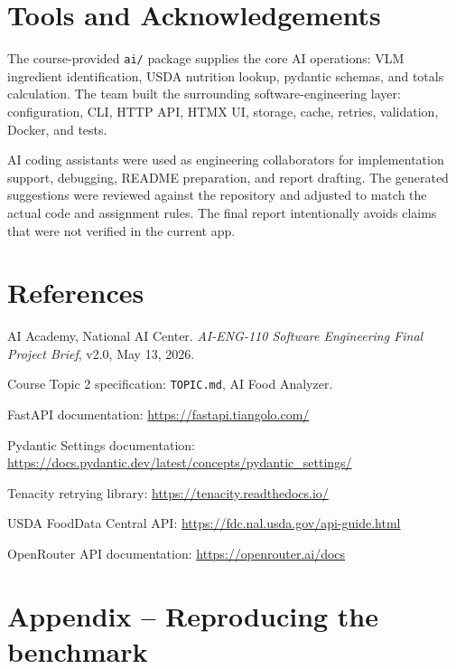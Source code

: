 \documentclass[11pt,a4paper]{article}
\begin{document}
\section{Tools and Acknowledgements}

The course-provided \texttt{ai/} package supplies the core AI operations: VLM ingredient identification, USDA nutrition lookup, pydantic schemas, and totals calculation. The team built the surrounding software-engineering layer: configuration, CLI, HTTP API, HTMX UI, storage, cache, retries, validation, Docker, and tests.

AI coding assistants were used as engineering collaborators for implementation support, debugging, README preparation, and report drafting. The generated suggestions were reviewed against the repository and adjusted to match the actual code and assignment rules. The final report intentionally avoids claims that were not verified in the current app.

\section*{References}

\begin{enumerate}[label={[\arabic*]},leftmargin=2.4em,itemsep=2pt]
  \item AI Academy, National AI Center. \textit{AI-ENG-110 Software Engineering Final Project Brief}, v2.0, May 13, 2026.
  \item Course Topic 2 specification: \texttt{TOPIC.md}, AI Food Analyzer.
  \item FastAPI documentation: \url{https://fastapi.tiangolo.com/}
  \item Pydantic Settings documentation: \url{https://docs.pydantic.dev/latest/concepts/pydantic_settings/}
  \item Tenacity retrying library: \url{https://tenacity.readthedocs.io/}
  \item USDA FoodData Central API: \url{https://fdc.nal.usda.gov/api-guide.html}
  \item OpenRouter API documentation: \url{https://openrouter.ai/docs}
\end{enumerate}

\appendix
\section{Appendix -- Reproducing the benchmark}
\end{document}
